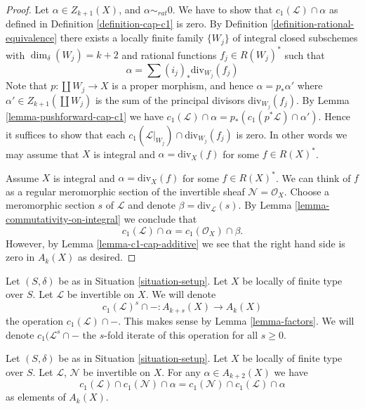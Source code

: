 \begin{proof}
Let $\alpha \in Z_{k + 1}(X)$, and $\alpha \sim_{rat} 0$.
We have to show that $c_1(\mathcal{L}) \cap \alpha$
as defined in Definition \ref{definition-cap-c1} is zero.
By Definition \ref{definition-rational-equivalence} there
exists a locally finite family $\{W_j\}$ of integral closed
subschemes with $\dim_\delta(W_j) = k + 2$ and rational functions
$f_j \in R(W_j)^*$ such that
$$
\alpha = \sum (i_j)_*\text{div}_{W_j}(f_j)
$$
Note that $p : \coprod W_j \to X$ is a proper morphism,
and hence $\alpha = p_*\alpha'$ where $\alpha' \in Z_{k + 1}(\coprod W_j)$
is the sum of the principal divisors $\text{div}_{W_j}(f_j)$.
By Lemma \ref{lemma-pushforward-cap-c1} we have
$c_1(\mathcal{L}) \cap \alpha = p_*(c_1(p^*\mathcal{L}) \cap \alpha')$.
Hence it suffices to show that each
$c_1(\mathcal{L}|_{W_j}) \cap \text{div}_{W_j}(f_j)$ is zero.
In other words we may assume that $X$ is integral and
$\alpha = \text{div}_X(f)$ for some $f \in R(X)^*$.

\medskip\noindent
Assume $X$ is integral and $\alpha = \text{div}_X(f)$ for some $f \in R(X)^*$.
We can think of $f$ as a regular meromorphic section of the invertible
sheaf $\mathcal{N} = \mathcal{O}_X$. Choose a meromorphic section
$s$ of $\mathcal{L}$ and denote $\beta = \text{div}_\mathcal{L}(s)$.
By Lemma \ref{lemma-commutativity-on-integral}
we conclude that
$$
c_1(\mathcal{L}) \cap \alpha = c_1(\mathcal{O}_X) \cap \beta.
$$
However, by Lemma \ref{lemma-c1-cap-additive} we see that the right hand side
is zero in $A_k(X)$ as desired.
\end{proof}

\noindent
Let $(S, \delta)$ be as in Situation \ref{situation-setup}.
Let $X$ be locally of finite type over $S$.
Let $\mathcal{L}$ be invertible on $X$.
We will denote
$$
c_1(\mathcal{L})^s \cap - : A_{k + s}(X) \to A_k(X)
$$
the operation $c_1(\mathcal{L}) \cap - $. This makes sense by
Lemma \ref{lemma-factors}. We will denote $c_1(\mathcal{L}^s \cap -$
the $s$-fold iterate of this operation for all $s \geq 0$.

\begin{lemma}
\label{lemma-cap-commutative}
Let $(S, \delta)$ be as in Situation \ref{situation-setup}.
Let $X$ be locally of finite type over $S$.
Let $\mathcal{L}$, $\mathcal{N}$ be invertible on $X$.
For any $\alpha \in A_{k + 2}(X)$ we have
$$
c_1(\mathcal{L}) \cap c_1(\mathcal{N}) \cap \alpha
=
c_1(\mathcal{N}) \cap c_1(\mathcal{L}) \cap \alpha
$$
as elements of $A_k(X)$.
\end{lemma}

